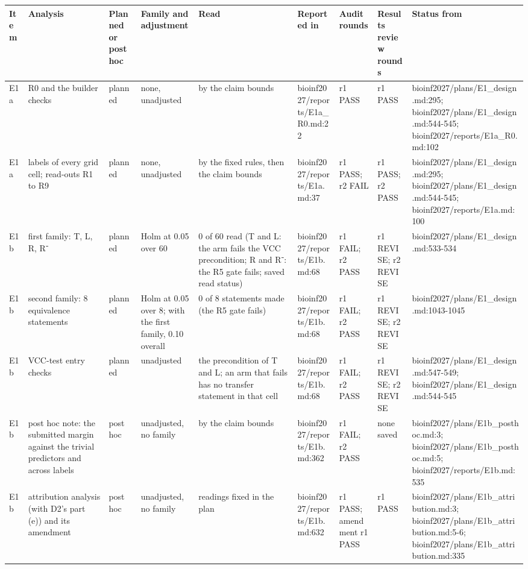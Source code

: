 \begin{tabular}{lllllllll}
\toprule
Item & Analysis & Planned or post hoc & Family and adjustment & Read & Reported in & Audit rounds & Results review rounds & Status from \\
\midrule
E1a & R0 and the builder checks & planned & none, unadjusted & by the claim bounds & bioinf2027/reports/E1a\_R0.md:22 & r1 PASS & r1 PASS & bioinf2027/plans/E1\_design.md:295; bioinf2027/plans/E1\_design.md:544-545; bioinf2027/reports/E1a\_R0.md:102 \\
E1a & labels of every grid cell; read-outs R1 to R9 & planned & none, unadjusted & by the fixed rules, then the claim bounds & bioinf2027/reports/E1a.md:37 & r1 PASS; r2 FAIL & r1 PASS; r2 PASS & bioinf2027/plans/E1\_design.md:295; bioinf2027/plans/E1\_design.md:544-545; bioinf2027/reports/E1a.md:100 \\
E1b & first family: T, L, R, R⁻ & planned & Holm at 0.05 over 60 & 0 of 60 read (T and L: the arm fails the VCC precondition; R and R⁻: the R5 gate fails; saved read status) & bioinf2027/reports/E1b.md:68 & r1 FAIL; r2 PASS & r1 REVISE; r2 REVISE & bioinf2027/plans/E1\_design.md:533-534 \\
E1b & second family: 8 equivalence statements & planned & Holm at 0.05 over 8; with the first family, 0.10 overall & 0 of 8 statements made (the R5 gate fails) & bioinf2027/reports/E1b.md:68 & r1 FAIL; r2 PASS & r1 REVISE; r2 REVISE & bioinf2027/plans/E1\_design.md:1043-1045 \\
E1b & VCC-test entry checks & planned & unadjusted & the precondition of T and L; an arm that fails has no transfer statement in that cell & bioinf2027/reports/E1b.md:68 & r1 FAIL; r2 PASS & r1 REVISE; r2 REVISE & bioinf2027/plans/E1\_design.md:547-549; bioinf2027/plans/E1\_design.md:544-545 \\
E1b & post hoc note: the submitted margin against the trivial predictors and across labels & post hoc & unadjusted, no family & by the claim bounds & bioinf2027/reports/E1b.md:362 & r1 FAIL; r2 PASS & none saved & bioinf2027/plans/E1b\_posthoc.md:3; bioinf2027/plans/E1b\_posthoc.md:5; bioinf2027/reports/E1b.md:535 \\
E1b & attribution analysis (with D2's part (e)) and its amendment & post hoc & unadjusted, no family & readings fixed in the plan & bioinf2027/reports/E1b.md:632 & r1 PASS; amendment r1 PASS & r1 PASS & bioinf2027/plans/E1b\_attribution.md:3; bioinf2027/plans/E1b\_attribution.md:5-6; bioinf2027/plans/E1b\_attribution.md:335 \\

\end{tabular}
